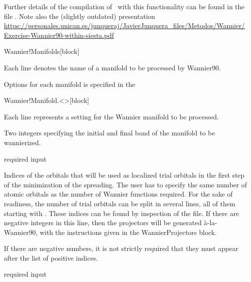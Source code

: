    Further details of the compilation of \siesta\ with this
   functionality can be found in the file
   . Note also the (slightly outdated) presentation
   \url{https://personales.unican.es/junqueraj/JavierJunquera_files/Metodos/Wannier/Exercise-Wannier90-within-siesta.pdf}

  \begin{fdfentry}{Wannier!Manifolds}[block]

    Each line denotes the name of a manifold to be processed by Wannier90.

    Options for each manifold is specified in the 

  \end{fdfentry}


  \begin{fdfentry}{Wannier!Manifold.<>}[block]

    Each line represents a setting for the Wannier manifold to be
    processed.

    \begin{fdfoptions}

      \option[bands]%

      Two integers specifying the initial and final band of the manifold
      to be wannierized.

      \note required input



      Indices of the orbitals that will be used
      as localized trial orbitals in the first step of the minimization
      of the spreading.
      The user has to specify the same number of atomic orbitals as the number
      of Wannier functions required.
      For the sake of readiness, the number of trial orbitals can be split in
      several lines, all of them starting with .
      These indices can be found by inspection of the
       file.
      If there are negative integers in this line, then the projectors will
      be generated \`a-la-Wannier90, with the instructions given in the
      WannierProjectors block.

      If there are negative numbers, it is not strictly required that
      they must appear after the list of positive indices.

      \note required input



\end{fdfoptions}
\end{fdfentry}
